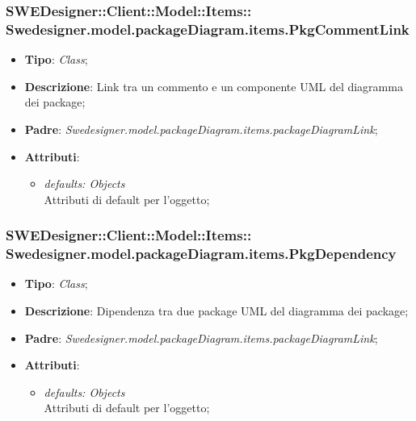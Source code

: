 \documentclass[../DefinizioneDiProdotto.tex]{subfiles}
\begin{document}
			\subsubsection[Swedesigner.model.packageDiagram.items.PkgCommentLink]{SWEDesigner::Client::Model::Items::\\Swedesigner.model.packageDiagram.items.PkgCommentLink}
			\hypertarget{SWEDesigner::Client::Model::Items::Swedesigner.model.packageDiagram.items.PkgCommentLink}{}
			\begin{itemize}
				\item \textbf{Tipo}: \emph{Class};
				\item \textbf{Descrizione}: Link tra un commento e un componente UML del diagramma dei package;
				\item \textbf{Padre}: \emph{Swedesigner.model.packageDiagram.items.packageDiagramLink};
				\item \textbf{Attributi}:
				\begin{itemize}
					\item \emph{defaults: Objects}\\
					Attributi di default per l'oggetto;
				\end{itemize}
			\end{itemize}
			
			\subsubsection[Swedesigner.model.packageDiagram.items.PkgDependency]{SWEDesigner::Client::Model::Items::\\Swedesigner.model.packageDiagram.items.PkgDependency}
			\hypertarget{SWEDesigner::Client::Model::Items::Swedesigner.model.packageDiagram.items.PkgDependency}{}
			\begin{itemize}
				\item \textbf{Tipo}: \emph{Class};
				\item \textbf{Descrizione}: Dipendenza tra due package UML del diagramma dei package;
				\item \textbf{Padre}: \emph{Swedesigner.model.packageDiagram.items.packageDiagramLink};
				\item \textbf{Attributi}:
				\begin{itemize}
					\item \emph{defaults: Objects}\\
					Attributi di default per l'oggetto;
				\end{itemize}
			\end{itemize}
			
\end{document}
